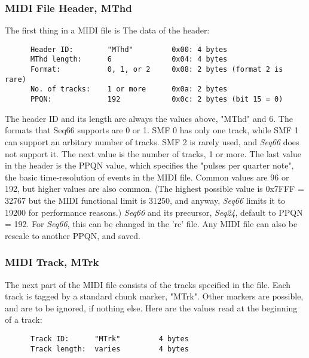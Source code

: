 \subsubsection{MIDI File Header, MThd}
\label{subsubsec:midi_format_header}

   The first thing in a MIDI file is The data of the header:

   \begin{verbatim}
      Header ID:        "MThd"         0x00: 4 bytes
      MThd length:      6              0x04: 4 bytes
      Format:           0, 1, or 2     0x08: 2 bytes (format 2 is rare)
      No. of tracks:    1 or more      0x0a: 2 bytes
      PPQN:             192            0x0c: 2 bytes (bit 15 = 0)
   \end{verbatim}

   The header ID and its length are always the values above, "MThd" and 6.
   The formats that Seq66 supports are 0 or 1.
   SMF 0 has only one track, while SMF 1 can
   support an arbitary number of tracks.
   SMF 2 is rarely used, and \textsl{Seq66} does not support it.
   The next value is the number of tracks, 1 or more.
   The last value in the header is the
   PPQN value, which specifies the "pulses per quarter note", the
   basic time-resolution of events in the MIDI file.  Common values are 96 or
   192, but higher values are also common.
   (The highest possible value is 0x7FFF = 32767 but the MIDI functional limit
   is 31250, and anyway,
   \textsl{Seq66} limits it to 19200 for performance reasons.)
   \textsl{Seq66} and its precursor, \textsl{Seq24}, default to PPQN = 192.
   For \textsl{Seq66}, this can be changed in the 'rc' file.
   Any MIDI file can also be rescale to another PPQN, and saved.

\subsubsection{MIDI Track, MTrk}
\label{subsubsec:midi_format_track}

   The next part of the MIDI file consists of the tracks specified in the file.
   Each track is tagged by
   a standard chunk marker, "MTrk".  Other markers are possible, and are to be
   ignored, if nothing else.  Here are the values read at the beginning of a
   track:

   \begin{verbatim}
      Track ID:      "MTrk"         4 bytes
      Track length:  varies         4 bytes
   \end{verbatim}

